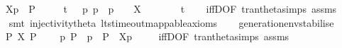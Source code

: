 \begin{isabellebody}
\ \ \ {\isacartoucheopen}{\isasymtheta}{\isacharbrackleft}{\kern0pt}X{\isacharbrackright}{\kern0pt}{\isacharparenleft}{\kern0pt}p{\isacharparenright}{\kern0pt}\ {\isasymlongmapsto}\isactrlsup {\isasymtheta}{\isasymalpha}\ P{\isacharprime}{\kern0pt}{\isacartoucheclose}\isanewline
\ \ \ {\isacartoucheopen}{\isasymalpha}\ {\isacharequal}{\kern0pt}\ t{\isacharunderscore}{\kern0pt}{\isasymepsilon}\ {\isasymor}\ {\isacharparenleft}{\kern0pt}{\isasymexists}\ p{\isacharprime}{\kern0pt}{\isachardot}{\kern0pt}\ p\ {\isasymlongmapsto}{\isasymalpha}\ p{\isacharprime}{\kern0pt}\ {\isasymand}\ {\isacharparenleft}{\kern0pt}{\isasymalpha}\ {\isasymin}\ X\ {\isasymor}\ {\isasymalpha}\ {\isacharequal}{\kern0pt}\ {\isasymtau}\ {\isasymor}\ {\isasymalpha}\ {\isacharequal}{\kern0pt}\ t{\isacharparenright}{\kern0pt}{\isacharparenright}{\kern0pt}{\isacartoucheclose}\isanewline
%
\isadelimproof
\ \ %
\endisadelimproof
%
\isatagproof
{}\isamarkupfalse%
\ iffD{}{\isacharbrackleft}{\kern0pt}OF\ tran{\isacharunderscore}{\kern0pt}theta{\isachardot}{\kern0pt}simps\ assms{\isacharbrackright}{\kern0pt}\isanewline
\ \ \isamarkupfalse%
\ {\isacharparenleft}{\kern0pt}smt\ injectivity{\isacharunderscore}{\kern0pt}theta{\isacharparenleft}{\kern0pt}{}{\isacharcomma}{\kern0pt}{}{\isacharparenright}{\kern0pt}\ lts{\isacharunderscore}{\kern0pt}timeout{\isacharunderscore}{\kern0pt}mappable{\isacharunderscore}{\kern0pt}axioms{\isacharparenright}{\kern0pt}%
\endisatagproof
{\isafoldproof}%
%
\isadelimproof
\isanewline
%
\endisadelimproof
\ \ \isanewline
{}\isamarkupfalse%
\ generation{\isacharunderscore}{\kern0pt}env{\isacharunderscore}{\kern0pt}stabilise{\isacharcolon}{\kern0pt}\isanewline
\ \ \ {\isacartoucheopen}P\ {\isasymlongmapsto}\isactrlsup {\isasymtheta}{\isasymepsilon}{\isacharbrackleft}{\kern0pt}X{\isacharbrackright}{\kern0pt}\ P{\isacharprime}{\kern0pt}{\isacartoucheclose}\isanewline
\ \ \ {\isacartoucheopen}{\isasymexists}\ p{\isachardot}{\kern0pt}\ P\ {\isacharequal}{\kern0pt}\ {\isasymtheta}{\isacharparenleft}{\kern0pt}p{\isacharparenright}{\kern0pt}\ {\isasymand}\ P{\isacharprime}{\kern0pt}\ {\isacharequal}{\kern0pt}\ {\isasymtheta}{\isacharbrackleft}{\kern0pt}X{\isacharbrackright}{\kern0pt}{\isacharparenleft}{\kern0pt}p{\isacharparenright}{\kern0pt}{\isacartoucheclose}\ \isanewline
%
\isadelimproof
\ \ %
\endisadelimproof
%
\isatagproof
{}\isamarkupfalse%
\ iffD{}{\isacharbrackleft}{\kern0pt}OF\ tran{\isacharunderscore}{\kern0pt}theta{\isachardot}{\kern0pt}simps\ assms{\isacharparenleft}{\kern0pt}{}{\isacharparenright}{\kern0pt}{\isacharbrackright}{\kern0pt}\ \isanewline

\end{isabellebody}
